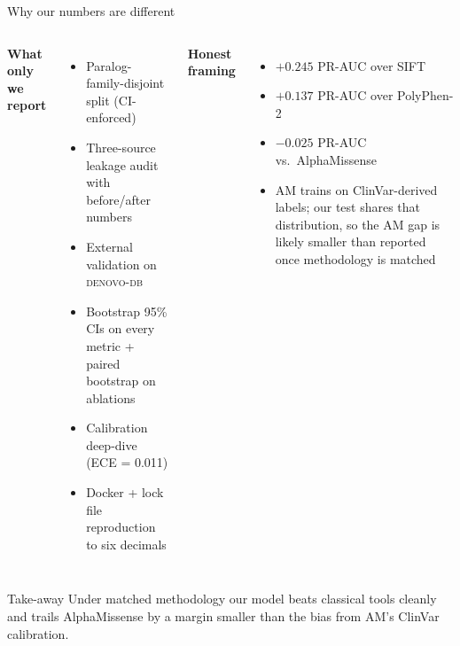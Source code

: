 \begin{frame}{Why our numbers are different}
  \begin{columns}[T]
    \textbf{What only we report}
    \begin{itemize}
      \item Paralog-family-disjoint split (CI-enforced)
      \item Three-source leakage audit with before/after numbers
      \item External validation on \textsc{denovo-db}
      \item Bootstrap 95\% CIs on every metric + paired bootstrap on ablations
      \item Calibration deep-dive (ECE = 0.011)
      \item Docker + lock file reproduction to six decimals
    \end{itemize}

    \textbf{Honest framing}
    \begin{itemize}
      \item $+0.245$ PR-AUC over SIFT
      \item $+0.137$ PR-AUC over PolyPhen-2
      \item $-0.025$ PR-AUC vs.\ AlphaMissense
      \item AM trains on ClinVar-derived labels; our test shares that distribution, so the AM gap is likely smaller than reported once methodology is matched
    \end{itemize}
  \end{columns}

  \vspace{0.6em}
  \begin{exampleblock}{Take-away}
    Under matched methodology our model beats classical tools cleanly and
    trails AlphaMissense by a margin smaller than the bias from AM's ClinVar
    calibration.
  \end{exampleblock}
\end{frame}



